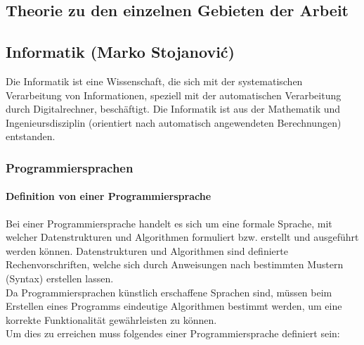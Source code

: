 \documentclass[12pt,a4paper]{report}
\begin{document}
\begin{onehalfspace}
\part{Theorie zu den einzelnen Gebieten der Arbeit}


\chapter{Informatik (Marko Stojanovi\'{c})}
Die Informatik ist eine Wissenschaft, die sich mit der systematischen Verarbeitung von Informationen, speziell mit der automatischen Verarbeitung durch Digitalrechner, beschäftigt. Die Informatik ist aus der Mathematik und Ingenieursdisziplin (orientiert nach automatisch angewendeten Berechnungen) entstanden.

\section{Programmiersprachen}

\subsection{Definition von einer Programmiersprache}
Bei einer Programmiersprache handelt es sich um eine formale Sprache, mit welcher Datenstrukturen und Algorithmen formuliert bzw. erstellt und ausgeführt werden können. Datenstrukturen und Algorithmen sind definierte Rechenvorschriften, welche sich durch Anweisungen nach bestimmten Mustern (Syntax) erstellen lassen.\\

Da Programmiersprachen künstlich erschaffene Sprachen sind, müssen beim Erstellen eines Programms eindeutige Algorithmen bestimmt werden, um eine korrekte Funktionalität gewährleisten zu können.\\
Um dies zu erreichen muss folgendes einer Programmiersprache definiert sein:


\end{onehalfspace}
\end{document}
